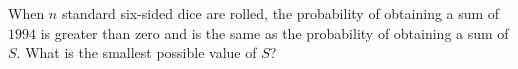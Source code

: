When $n$ standard six-sided dice are rolled, the probability of obtaining a sum of $1994$ is greater than zero and is the same as the probability of obtaining a sum of $S$. What is the smallest possible value of $S$?
